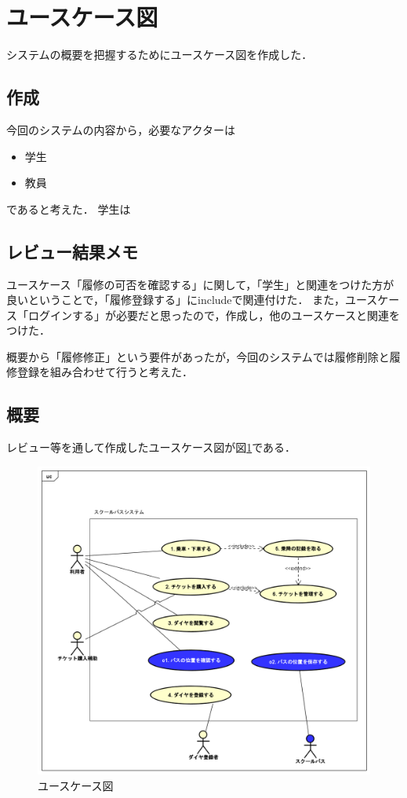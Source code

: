 \documentclass[documentclass]{jsarticle}
\begin{document}
\newpage

\section{ユースケース図}
システムの概要を把握するためにユースケース図を作成した．
\subsection*{作成}
今回のシステムの内容から，必要なアクターは
\begin{itemize}
  \item 学生
  \item 教員
\end{itemize}
であると考えた．
学生は

\subsection*{レビュー結果メモ}
ユースケース「履修の可否を確認する」に関して，「学生」と関連をつけた方が良いということで，「履修登録する」にincludeで関連付けた．
また，ユースケース「ログインする」が必要だと思ったので，作成し，他のユースケースと関連をつけた．

概要から「履修修正」という要件があったが，今回のシステムでは履修削除と履修登録を組み合わせて行うと考えた．

\subsection*{概要}
レビュー等を通して作成したユースケース図が図\ref*{fig:3-1}である．
\begin{figure}[H]
  \begin{center}
    \includegraphics*[scale=0.5]{figure/3-1.png}
  \end{center}
  \caption{ユースケース図}
  \label{fig:3-1}
\end{figure}
\end{document}
